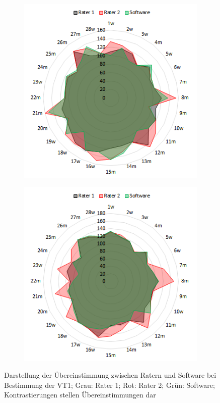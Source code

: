 %
\begin{figure}[H]
	\centering
	\begin{subfigure}[c]{0.45\textwidth}
		\centering
		\includegraphics[scale=0.7]{Bilder/v-slope_net}
			\label{subpic:pic1}
	\end{subfigure}%
	\hfil
	\begin{subfigure}[c]{0.45\textwidth}
		\centering
		\includegraphics[scale=0.7]{Bilder/eqo2_net}
			\label{subpic:pic2}
	\end{subfigure}
\caption[Grafische Darstellung der Übereinstimmung für die VT1]{Darstellung der Übereinstimmung zwischen Ratern und Software bei Bestimmung der VT1; Grau: Rater 1; Rot: Rater 2; Grün: Software; Kontrastierungen stellen Übereinstimmungen dar}
\label{pic:pic22}
\end{figure}
